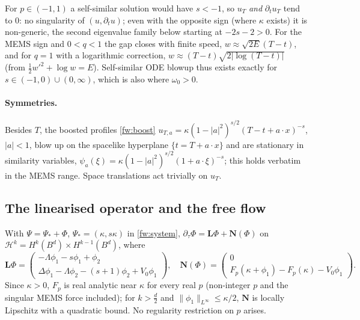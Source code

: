 \begin{remark}\label{power:rem-small-p}
For $p\in(-1,1)$ a self-similar solution would have $s<-1$, so $u_T$
\emph{and} $\partial_tu_T$ tend to $0$: no singularity of $(u,\partial_tu)$; even
with the opposite sign (where $\kappa$ exists) it is non-generic, the
second eigenvalue family below starting at $-2s-2>0$. For the MEMS sign and
$0<q<1$ the gap closes with finite speed, $w\approx\sqrt{2E}(T-t)$, and for $q=1$
with a logarithmic correction, $w\approx(T-t)\sqrt{2|\log(T-t)|}$ (from
$\frac12w'^2+\log w=E$). Self-similar ODE blowup thus exists exactly for
$s\in(-1,0)\cup(0,\infty)$, which is also where $\omega_0>0$.
\end{remark}

\paragraph{Symmetries.} Besides $T$, the boosted profiles \eqref{fw:boost}
$u_{T,a}=\kappa(1-|a|^2)^{s/2}(T-t+a\cdot x)^{-s}$, $|a|<1$, blow up on the
spacelike hyperplane $\{t=T+a\cdot x\}$ and are stationary in similarity
variables, $\psi_a(\xi)=\kappa(1-|a|^2)^{s/2}(1+a\cdot\xi)^{-s}$; this holds verbatim
in the MEMS range. Space translations act trivially on $u_T$.

\subsection{The linearised operator and the free flow}
\label{power:subsec-linear}

With $\Psi=\Psi_*+\Phi$, $\Psi_*=(\kappa,s\kappa)$ in \eqref{fw:system},
$\partial_\tau\Phi=\mathbf L\Phi+\mathbf N(\Phi)$ on
$\mathcal H^k=H^k(B^d)\times H^{k-1}(B^d)$, where
\[
  \mathbf L\Phi=\begin{pmatrix}-\Lambda\phi_1-s\phi_1+\phi_2\\ \Delta\phi_1-\Lambda\phi_2-(s+1)\phi_2+V_0\phi_1\end{pmatrix},\quad
  \mathbf N(\Phi)=\begin{pmatrix}0\\ F_p(\kappa+\phi_1)-F_p(\kappa)-V_0\phi_1\end{pmatrix}.
\]
Since $\kappa>0$, $F_p$ is real analytic near $\kappa$ for every real $p$
(non-integer $p$ and the singular MEMS force included); for $k>\frac d2$ and
$\|\phi_1\|_{L^\infty}\le\kappa/2$, $\mathbf N$ is locally Lipschitz with a
quadratic bound. No regularity restriction on $p$ arises.

